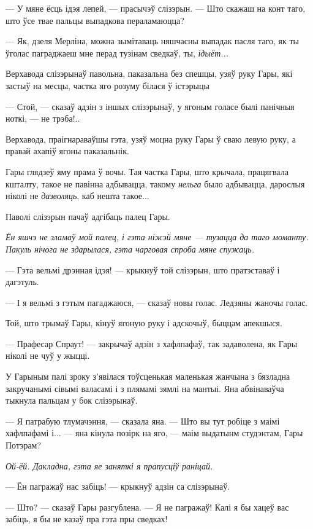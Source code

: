 --- У мяне ёсць ідэя лепей, --- прасычэў слізэрын. --- Што скажаш на конт 
таго, што ўсе твае пальцы выпадкова пераламаюцца?

--- Як, дзеля Мерліна, можна зымітаваць няшчасны выпадак пасля таго, як ты 
ўголас паграджаеш мне перад тузінам сведкаў, ты, \emph{ідыёт...}

Верхавода слізэрынаў павольна, паказальна без спешцы, узяў руку Гары, які застыў 
на месцы, частка яго розуму білася ў істэрыцы  

--- Стой, --- сказаў адзін з іншых слізэрынаў, у ягоным голасе былі панічныя ноткі, --- 
не трэба!..

Верхавода, праігнараваўшы гэта, узяў моцна руку Гары ў сваю левую руку, а 
правай ахапіў ягоны паказальнік.

Гары глядзеў яму прама ў вочы. Тая частка Гары, што крычала, працягвала кшталту,
такое не павінна адбывацца, такому \emph{нельга} было адбывацца, дарослыя ніколі 
не \emph{дазволяць}, каб нешта такое... 

Паволі слізэрын пачаў адгібаць палец Гары.

\emph{Ён яшчэ не зламаў мой палец, і гэта ніжэй мяне --- тузацца да таго моманту. 
Пакуль нічога не здарылася, гэта чарговая спроба мяне спужаць.}

--- Гэта вельмі дрэнная ідэя! --- крыкнуў той слізэрын, што пратэставаў і дагэтуль.

--- І я вельмі з гэтым пагаджаюся, --- сказаў новы голас. Ледзяны жаночы голас.

Той, што трымаў Гары, кінуў ягоную руку і адскочыў, быццам апекшыся.

--- Прафесар Спраут! --- закрычаў адзін з хафлпафаў, так задаволена, як Гары ніколі 
не чуў у жыцці.

У Гарыным палі зроку з'явілася тоўсценькая маленькая жанчына з бязладна 
закручанымі сівымі валасамі і з плямамі зямлі на мантыі. Яна абвінаваўча
тыкнула пальцам у бок слізэрынаў. 

--- Я патрабую тлумачэння, --- сказала яна. --- Што вы тут робіце з маімі хафлпафамі
і... --- яна кінула позірк на яго, --- маім выдатынм студэнтам, Гары Потэрам?

\emph{Ой-ёй. Дакладна, гэта яе заняткі я прапусціў раніцай.}

--- Ён пагражаў нас забіць! --- крыкнуў адзін са слізэрынаў.

--- Што? --- сказаў Гары разгублена. --- Я не пагражаў! Калі я бы хацеў вас забіць,
я бы не казаў пра гэта пры сведках!

